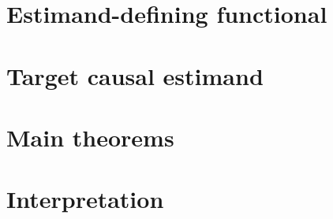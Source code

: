 \documentclass[11pt]{article}
\theoremstyle{definition}
\theoremstyle{plain}
\theoremstyle{remark}
\begin{document}
\section{Estimand-defining functional}

\section{Target causal estimand}

\section{Main theorems}

\section{Interpretation}
\end{document}
